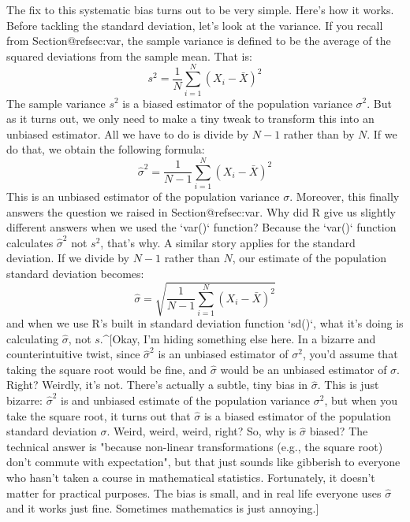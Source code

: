 The fix to this systematic bias turns out to be very simple. Here's how it works. Before tackling the standard deviation, let's look at the variance. If you recall from Section@refsec:var, the sample variance is defined to be the average of the squared deviations from the sample mean. That is:
$$
s^2 = \frac{1}{N} \sum_{i=1}^N (X_i - \bar{X})^2
$$
The sample variance $s^2$ is a biased estimator of the population variance $\sigma^2$. But as it turns out, we only need to make a tiny tweak to transform this into an unbiased estimator. All we have to do is divide by $N-1$ rather than by $N$. If we do that, we obtain the following formula:
$$
\hat\sigma^2 = \frac{1}{N-1} \sum_{i=1}^N (X_i - \bar{X})^2 
$$
This is an unbiased estimator of the population variance $\sigma$. Moreover, this finally answers the question we raised in Section@refsec:var. Why did R give us slightly different answers when we used the `var()` function? Because the `var()` function calculates $\hat\sigma^2$ not $s^2$, that's why. A similar story applies for the standard deviation. If we divide by $N-1$ rather than $N$, our estimate of the population standard deviation becomes:
$$
\hat\sigma = \sqrt{\frac{1}{N-1} \sum_{i=1}^N (X_i - \bar{X})^2} 
$$
and when we use R's built in standard deviation function `sd()`, what it's doing is calculating $\hat\sigma$, not $s$.^[Okay, I'm hiding something else here. In a bizarre and counterintuitive twist, since $\hat\sigma^2$ is an unbiased estimator of $\sigma^2$, you'd assume that taking the square root would be fine, and $\hat\sigma$ would be an unbiased estimator of $\sigma$. Right? Weirdly, it's not. There's actually a subtle, tiny bias in $\hat\sigma$. This is just bizarre: $\hat\sigma^2$ is and unbiased estimate of the population variance $\sigma^2$, but when you take the square root, it turns out that $\hat\sigma$ is a biased estimator of the population standard deviation $\sigma$. Weird, weird, weird, right? So, why is $\hat\sigma$ biased? The technical answer is "because non-linear transformations (e.g., the square root) don't commute with expectation", but that just sounds like gibberish to everyone who hasn't taken a course in mathematical statistics. Fortunately, it doesn't matter for practical purposes. The bias is small, and in real life everyone uses $\hat\sigma$ and it works just fine. Sometimes mathematics is just annoying.] 

